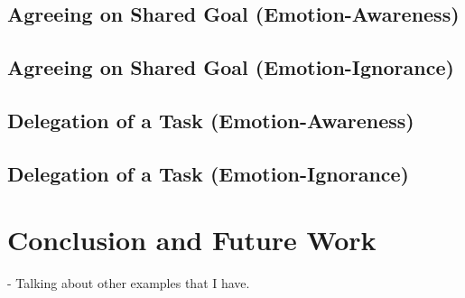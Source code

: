 \subsection{Agreeing on Shared Goal (Emotion-Awareness)}
\label{sec:wt-exp1}

\subsection{Agreeing on Shared Goal (Emotion-Ignorance)}
\label{sec:wt-exp2}

\subsection{Delegation of a Task (Emotion-Awareness)}
\label{sec:wt-exp3}

\subsection{Delegation of a Task (Emotion-Ignorance)}
\label{sec:wt-exp4}

\section{Conclusion and Future Work}

- Talking about other examples that I have.




%
%



